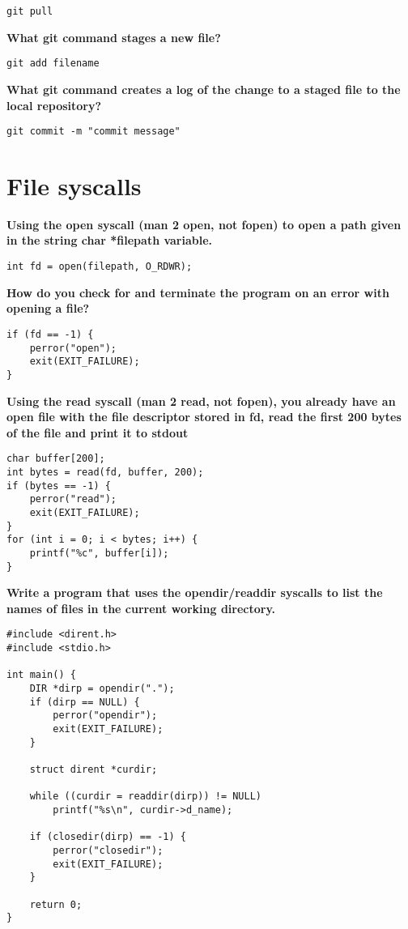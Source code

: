\documentclass{article}
\begin{document}
\begin{verbatim}
git pull
\end{verbatim}

\textbf{What git command stages a new file?}

\begin{verbatim}
git add filename
\end{verbatim}

\textbf{What git command creates a log of the change to a staged file to the local repository?}

\begin{verbatim}
git commit -m "commit message"
\end{verbatim}

\section*{File syscalls}
\textbf{Using the open syscall (man 2 open, not fopen) to open a path given in the string char
*filepath variable.}

\begin{verbatim}
int fd = open(filepath, O_RDWR);
\end{verbatim}

\textbf{How do you check for and terminate the program on an error with opening a file?}

\begin{verbatim}
if (fd == -1) {
    perror("open");
    exit(EXIT_FAILURE);
}
\end{verbatim}

\textbf{Using the read syscall (man 2 read, not fopen), you already have an open file with the file
descriptor stored in fd, read the first 200 bytes of the file and print it to stdout}

\begin{verbatim}
char buffer[200];
int bytes = read(fd, buffer, 200);
if (bytes == -1) {
    perror("read");
    exit(EXIT_FAILURE);
}
for (int i = 0; i < bytes; i++) {
    printf("%c", buffer[i]);
}
\end{verbatim}

\textbf{Write a program that uses the opendir/readdir syscalls to list the names of files in the
current working directory.}

\begin{verbatim}
#include <dirent.h>
#include <stdio.h>

int main() {
    DIR *dirp = opendir(".");
    if (dirp == NULL) {
        perror("opendir");
        exit(EXIT_FAILURE);
    }

    struct dirent *curdir;

    while ((curdir = readdir(dirp)) != NULL)
        printf("%s\n", curdir->d_name);
    
    if (closedir(dirp) == -1) {
        perror("closedir");
        exit(EXIT_FAILURE);
    }

    return 0;
}
\end{verbatim}
\end{document}
